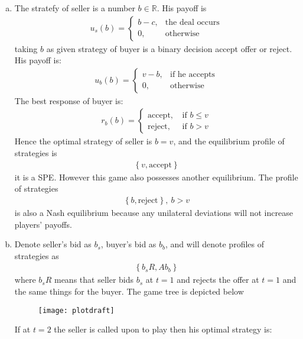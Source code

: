 \documentclass[a4paper]{article}
\begin{document}
\begin{enumerate}[(a)]
	\item The stratefy of seller is a number $b \in \mathbb{R}$. His payoff is
	\begin{align*}
	u_s(b) = \begin{cases}
	b - c, &\text{the deal occurs}\\
	0, &\text{otherwise}
	\end{cases}
	\end{align*}
	taking $b$ as given strategy of buyer is a binary decision accept offer or reject. His payoff is:
	\begin{align*}
	u_b(b) = \begin{cases}
	v - b, &\text{if he accepts}\\
	0, &\text{otherwise}
	\end{cases}
	\end{align*}
	The best response of buyer is:
	\begin{align*}
	r_b(b) = \begin{cases}
	\text{accept}, &\text{ if } b \le v\\
	\text{reject}, &\text{ if } b > v
	\end{cases}
	\end{align*}
	Hence the optimal strategy of seller is $b = v$, and the equilibrium profile of strategies is
	\begin{align*}
	\left\{v, \text{accept}\right\}
	\end{align*}
	it is a SPE. However this game also possesses another equilibrium. The profile of strategies
	\begin{align*}
	\left\{b, \text{reject} \right\},\ b > v
	\end{align*}
	is also a Nash equilibrium because any unilateral deviations will not increase players' payoffs.
	\item Denote seller's bid as $b_s$, buyer's bid as $b_b$, and will denote profiles of strategies as
	\begin{align*}
	\left\{b_sR, Ab_b\right\}
	\end{align*}
	where $b_sR$ means that seller bids $b_s$ at $t = 1$ and rejects the offer at $t = 1$ and the same things for the buyer. The game tree is depicted below
	\begin{figure}[H]
		\centering
		\texttt{[image: plotdraft]}
		\caption{}\label{fig1}
	\end{figure}
	If at $t = 2$ the seller is called upon to play then his optimal strategy is:
	\begin{align*}

\end{align*}
\end{enumerate}
\end{document}
